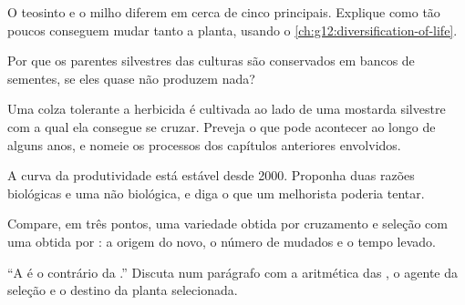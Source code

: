 \begin{exercise}[$\star\star$]\label{exo:g12:domesticated-plants:10}
O teosinto e o milho diferem em cerca de cinco  principais.
Explique como tão poucos  conseguem mudar tanto a planta, usando o
\cref{ch:g12:diversification-of-life}.
\end{exercise}

\begin{exercise}[$\star\star$]\label{exo:g12:domesticated-plants:11}
Por que os parentes silvestres das culturas são conservados em bancos
de sementes, se eles quase não produzem nada?
\end{exercise}

\begin{exercise}[$\star\star\star$]\label{exo:g12:domesticated-plants:12}
Uma colza tolerante a herbicida é cultivada ao lado de uma mostarda
silvestre com a qual ela consegue se cruzar. Preveja o que pode
acontecer ao longo de alguns anos, e nomeie os processos dos capítulos
anteriores envolvidos.
\end{exercise}

\begin{exercise}[$\star\star\star$]\label{exo:g12:domesticated-plants:13}
A curva da produtividade está estável desde 2000. Proponha duas razões
biológicas e uma não biológica, e diga o que um melhorista poderia tentar.
\end{exercise}

\begin{exercise}[$\star\star\star$]\label{exo:g12:domesticated-plants:14}
Compare, em três pontos, uma variedade obtida por cruzamento e seleção
com uma obtida por : a origem do  novo, o número de
 mudados e o tempo levado.
\end{exercise}

\begin{exercise}[$\star\star\star$]\label{exo:g12:domesticated-plants:15}
``A  é o contrário da .'' Discuta num
parágrafo com a aritmética das , o agente da
seleção e o destino da planta selecionada.
\end{exercise}

